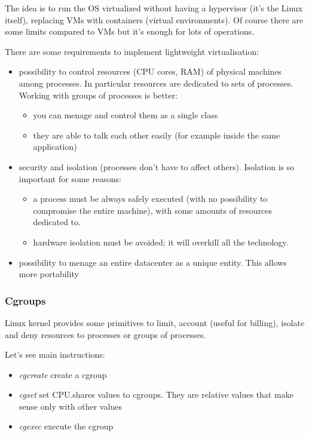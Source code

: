 The idea is to run the OS virtualized without having a hypervisor (it's the Linux itself), replacing VMs with containers (virtual environments). Of course there are some limits compared to VMs but it's enough for lots of operations.

There are some requirements to implement lightweight virtualisation:
\begin{itemize}
    \item possibility to control resources (CPU cores, RAM) of physical machines among processes. In particular resources are dedicated to sets of processes.
    Working with groups of processes is better:
    \begin{itemize}
        \item you can menage and control them as a single class
        \item they are able to talk each other easily (for example inside the same application)
    \end{itemize}
    \item security and isolation (processes don't have to affect others). Isolation is so important for some reasons:
    \begin{itemize}
        \item a process must be always safely executed (with no possibility to compromise the entire machine), with some amounts of resources dedicated to.
        \item hardware isolation must be avoided; it will overkill all the technology.
    \end{itemize}
    \item possibility to menage an entire datacenter as a unique entity. This allows more portability
\end{itemize}

\subsubsection{Cgroups}
Linux kernel provides some primitives to limit, account (useful for billing), isolate and deny resources to processes or groups of processes.

Let's see main instructions:
\begin{itemize}
    \item \textit{cgcreate} create a cgroup
    \item \textit{cgset} set CPU.shares values to cgroups. They are relative values that make sense only with other values
    \item \textit{cgexec} execute the cgroup
\end{itemize}

